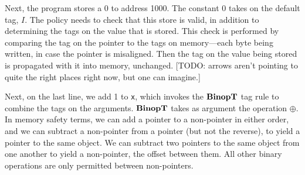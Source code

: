 \documentclass{llncs}
\begin{document}
Next, the program stores a 0 to address 1000. The constant 0
takes on the default tag, \(I\). The policy needs to check that
this store is valid, in addition to determining the tags on the value that is stored.
This check is performed by comparing the tag on the pointer to the tags on memory---each
byte being written, in case the pointer is misaligned. Then the tag on the value being stored
is propagated with it into memory, unchanged.
[TODO: arrows aren't pointing to quite the right places right now, but one can imagine.]

  
\vspace{\abovedisplayskip}

Next, on the last line, we add 1 to {\tt x}, which invokes the \(\mathbf{BinopT}\) tag rule
to combine the tags on the arguments. \(\mathbf{BinopT}\) takes as argument the operation \(\oplus\).
In memory safety terms, we can add a pointer to a non-pointer in either order, and we can subtract
a non-pointer from a pointer (but not the reverse), to yield a pointer to the same object. We can
subtract two pointers to the same object from one another to yield a non-pointer, the offset between them.
All other binary operations are only permitted between non-pointers.
\end{document}
